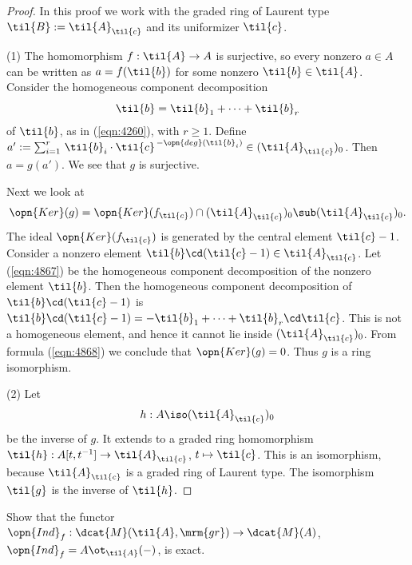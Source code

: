 \begin{proof}
In this proof we work with the graded ring of Laurent type 
$\til{B} := \til{A}_{\til{c}}$ and its uniformizer $\til{c}$.

\medskip \noindent 
(1) The homomorphism $f : \til{A} \to A$ is surjective, so every nonzero 
$a \in A$ can be written as 
$a = f(\til{b})$ for some nonzero $\til{b} \in \til{A}$. 
Consider the homogeneous component decomposition 
\begin{equation}  \label{eqn:4867}
\til{b} = \til{b}_{1} + \cdots + \til{b}_{r}
\end{equation}
of $\til{b}$, as in (\ref{eqn:4260}), with $r \geq 1$. Define 
$a' := \sum_{i = 1}^{r} \, \til{b}_i \cdot 
\til{c}^{\, - \opn{deg}(\til{b}_i)} \in (\til{A}_{\til{c}})_0$.
Then $a = g(a')$. We see that $g$ is surjective.

Next we look at 
\begin{equation}  \label{eqn:4868}
\opn{Ker}(g) = \opn{Ker}(f_{\til{c}}) \cap (\til{A}_{\til{c}})_0 
\sub (\til{A}_{\til{c}})_0 . 
\end{equation}
The ideal $\opn{Ker}(f_{\til{c}})$ is generated by the central element 
$\til{c} - 1$.
Consider a nonzero element $\til{b} \cd (\til{c} - 1) \in \til{A}_{\til{c}}$.
Let (\ref{eqn:4867}) be the homogeneous component decomposition of the nonzero 
element $\til{b}$. Then the homogeneous component decomposition
of $\til{b} \cd (\til{c} - 1)$ is 
$\til{b} \cd (\til{c} - 1) = -\til{b}_{1} + \cdots + \til{b}_{r} \cd \til{c}$.
This is not a homogeneous element, and hence it cannot lie inside 
$(\til{A}_{\til{c}})_0$. From formula (\ref{eqn:4868}) we conclude that 
$\opn{Ker}(g) = 0$. 
Thus $g$ is a ring isomorphism. 

\medskip \noindent 
(2) Let 
\begin{equation} \label{eqn:4476}
h : A \iso (\til{A}_{\til{c}})_0
\end{equation}
be the inverse of $g$. It extends to a graded ring homomorphism
$\til{h} : A[t, t^{-1}] \to  \til{A}_{\til{c}}$,
$t \mapsto \til{c}$. 
This is an isomorphism, because $\til{A}_{\til{c}}$ is a graded ring of Laurent 
type. The isomorphism $\til{g}$ is the inverse of $\til{h}$.
\end{proof}

\begin{exer} \label{exer:4475}
Show that the functor
$\opn{Ind}_f : \dcat{M}(\til{A}, \mrm{gr}) \to \dcat{M}(A)$,
$\opn{Ind}_f = A \ot_{\til{A}} (-)$, 
is exact.
\end{exer}

